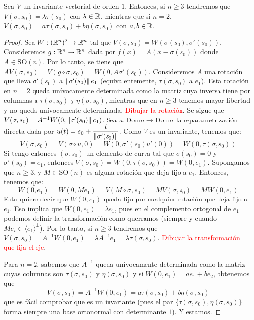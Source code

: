 \begin{prop}
Sea $V$ un invariante vectorial de orden $1$. Entonces, si $n\geq 3$ tendremos que $V(\sigma,s_0) = \lambda\tau(s_0)$ con $\lambda\in\mathbb{R}$, mientras que si $n=2$, $V(\sigma,s_0)=a\tau(\sigma,s_0)+b\eta(\sigma,s_0)$ con $a,b\in\mathbb{R}$.
\begin{proof}
Sea $W:(\mathbb{R}^n)^2\to\mathbb{R}^n$ tal que $V(\sigma,s_0)=W(\sigma(s_0),\sigma'(s_0))$. Consideremos $g:\mathbb{R}^n\to\mathbb{R}^n$ dada por $f(x)=A(x-\sigma(s_0))$ donde $A\in\mathrm{SO}(n)$. Por lo tanto, se tiene que $AV(\sigma,s_0)=V(g\circ\sigma,s_0) =W(0,A\sigma'(s_0))$. Consideremos $A$ una rotación que lleva $\sigma'(s_0)$ a $\left\| \sigma'(s_0) \right\|e_1$ (equivalentemente, $\tau(\sigma,s_0)$ a $e_1$). Esta rotación en $n=2$ queda unívocamente determinada como la matriz cuya inversa tiene por columnas a $\tau(\sigma,s_0)$ y $\eta(\sigma,s_0)$, mientras que en $n\geq 3$ tenemos mayor libertad y no queda unívocamente determinada. \textcolor{red}{Dibujar la rotación}. Se sigue que $V(\sigma,s_0) = A^{-1}W(0,\left\| \sigma'(s_0) \right\|e_1)$. Sea $u:\mathrm{Dom}\sigma\to\mathrm{Dom}\sigma$ la reparametrización directa dada por $u(t)=s_0+\dfrac{t}{\left\| \sigma'(s_0) \right\|}$. Como $V$ es un invariante, tenemos que: $$V(\sigma,s_0)=V(\sigma\circ u,0)=W(0,\sigma'(s_0)u'(0)) = W(0,\tau(\sigma,s_0))$$ Si tengo entonces $(\sigma,s_0)$ un elemento de curva tal que $\sigma(s_0)=0$ y $\sigma'(s_0)=e_1$, entonces $V(\sigma,s_0)=W(0,\tau(\sigma,s_0)) = W(0,e_1)$. Supongamos que $n\geq 3$, y $M\in\mathrm{SO}(n)$ es alguna rotación que deja fijo a $e_1$. Entonces, tenemos que: $$W(0,e_1)=W(0,Me_1)=V(M\circ\sigma,s_0)=MV(\sigma,s_0)=MW(0,e_1)$$ Esto quiere decir que $W(0,e_1)$ queda fijo por cualquier rotación que deja fijo a $e_1$. Eso implica que $W(0,e_1)=\lambda e_1$, pues en el complemento ortogonal de $e_1$ podemos definir la transformación como querramos (siempre y cuando $Me_i\in\langle e_1\rangle^{\perp}$). Por lo tanto, si $n\geq 3$ tendremos que $V(\sigma,s_0)=A^{-1}W(0,e_1)=\lambda A^{-1}e_1 = \lambda \tau(\sigma,s_0)$. \textcolor{red}{Dibujar la transformación que fija el eje}.

Para $n=2$, sabemos que $A^{-1}$ queda unívocamente determinada como la matriz cuyas columnas son $\tau(\sigma,s_0)$ y $\eta(\sigma,s_0)$ y si $W(0,e_1)=ae_1 + be_2$, obtenemos que $$V(\sigma,s_0)=A^{-1}W(0,e_1) = a\tau(\sigma,s_0)+b\eta(\sigma,s_0)$$ que es fácil comprobar que es un invariante (pues el par $\{\tau(\sigma,s_0),\eta(\sigma,s_0)\}$ forma siempre una base ortonormal con determinante $1$). Y estamos.
\end{proof}
\end{prop}

